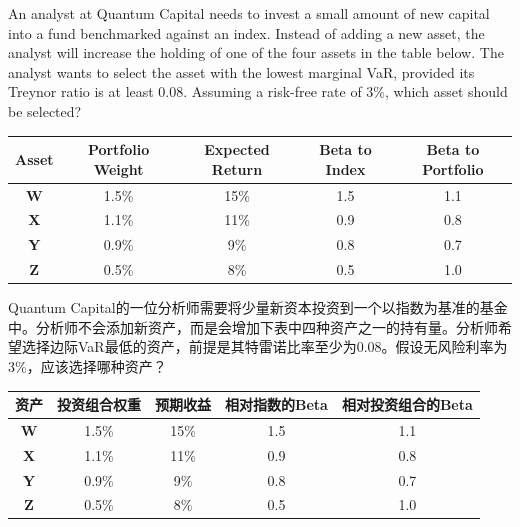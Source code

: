 \documentclass{article}
\newcounter{question} %
\begin{document}
\begin{question}
    An analyst at Quantum Capital needs to invest a small amount of new capital into a fund benchmarked against an index. Instead of adding a new asset, the analyst will increase the holding of one of the four assets in the table below. The analyst wants to select the asset with the lowest marginal VaR, provided its Treynor ratio is at least 0.08. Assuming a risk-free rate of 3\%, which asset should be selected?

    \begin{table}[htbp]
        \centering
        \renewcommand{\arraystretch}{1.2}
        \begin{tabular}{|c|c|c|c|c|}
            \hline
            \textbf{Asset} & \textbf{Portfolio Weight} & \textbf{Expected Return} & \textbf{Beta to Index} & \textbf{Beta to Portfolio} \\
            \hline
            \textbf{W} & 1.5\% & 15\% & 1.5 & 1.1 \\
            \textbf{X} & 1.1\% & 11\% & 0.9 & 0.8 \\
            \textbf{Y} & 0.9\% & 9\%  & 0.8 & 0.7 \\
            \textbf{Z} & 0.5\% & 8\%  & 0.5 & 1.0 \\
            \hline
        \end{tabular}
    \end{table}
    Quantum Capital的一位分析师需要将少量新资本投资到一个以指数为基准的基金中。分析师不会添加新资产，而是会增加下表中四种资产之一的持有量。分析师希望选择边际VaR最低的资产，前提是其特雷诺比率至少为0.08。假设无风险利率为3\%，应该选择哪种资产？

    \begin{table}[htbp]
        \centering
        \renewcommand{\arraystretch}{1.2}
        \begin{tabular}{|c|c|c|c|c|}
            \hline
            \textbf{资产} & \textbf{投资组合权重} & \textbf{预期收益} & \textbf{相对指数的Beta} & \textbf{相对投资组合的Beta} \\
            \hline
            \textbf{W} & 1.5\% & 15\% & 1.5 & 1.1 \\
            \textbf{X} & 1.1\% & 11\% & 0.9 & 0.8 \\
            \textbf{Y} & 0.9\% & 9\%  & 0.8 & 0.7 \\
            \textbf{Z} & 0.5\% & 8\%  & 0.5 & 1.0 \\
            \hline
        \end{tabular}
    \end{table}
\end{question}
\end{document}
